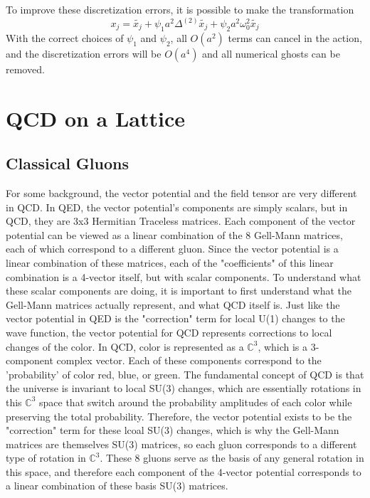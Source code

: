 \documentclass{article}
\begin{document}
To improve these discretization errors, it is possible to make the transformation
\begin{equation}
    x_j = \tilde{x_j} + \psi_1 a^2 \Delta^(2)\tilde{x_j} + \psi_2 a^2 \omega_0^2 \tilde{x_j}
\end{equation}
With the correct choices of $\psi_1$ and $\psi_2$, all $O(a^2)$ terms can cancel in the action, and the discretization errors will be $O(a^4)$ and all numerical ghosts can be removed.
\section{QCD on a Lattice}
\subsection{Classical Gluons}
For some background, the vector potential and the field tensor are very different in QCD.
In QED, the vector potential's components are simply scalars, but in QCD, they are 3x3 Hermitian Traceless matrices.
Each component of the vector potential can be viewed as a linear combination of the 8 Gell-Mann matrices, each of which correspond to a different gluon.
Since the vector potential is a linear combination of these matrices, each of the "coefficients" of this linear combination is a 4-vector itself, but with scalar components.
To understand what these scalar components are doing, it is important to first understand what the Gell-Mann matrices actually represent, and what QCD itself is.
Just like the vector potential in QED is the "correction" term for local U(1) changes to the wave function, the vector potential for QCD represents corrections to local changes of the color.
In QCD, color is represented as a $\mathbb{C}^3$, which is a 3-component complex vector. Each of these components correspond to the 'probability' of color red, blue, or green.
The fundamental concept of QCD is that the universe is invariant to local SU(3) changes, which are essentially rotations in this $\mathbb{C}^3$ space that switch around the probability amplitudes of each color while preserving the total probability.
Therefore, the vector potential exists to be the "correction" term for these lcoal SU(3) changes, which is why the Gell-Mann matrices are themselves SU(3) matrices, so each gluon corresponds to a different type of rotation in $\mathbb{C}^3$. 
These 8 gluons serve as the basis of any general rotation in this space, and therefore each component of the 4-vector potential corresponds to a linear combination of these basis SU(3) matrices. \newline
\end{document}

